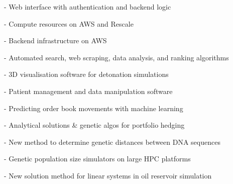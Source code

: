\documentclass[a4paper]{custom-resume}
\begin{document}
\begin{minipage}[t][0.8\textheight]{0.66\textwidth}
\vspace{2pt}
\sectionspace


\vspace{2pt}

- Web interface with authentication and backend logic

\vspace{2pt}

- Compute resources on AWS and Rescale

\vspace{2pt}

- Backend infrastructure on AWS

\vspace{2pt}

- Automated search, web scraping, data analysis, and ranking algorithms

\vspace{2pt}

- 3D visualisation software for detonation simulations

\vspace{2pt}

- Patient management and data manipulation software

\vspace{2pt}
\sectionspace


\vspace{2pt}

- Predicting order book movements with machine learning

\vspace{2pt}

- Analytical solutions \& genetic algos for portfolio hedging

\vspace{2pt}

- New method to determine genetic distances between DNA sequences

\vspace{2pt}

- Genetic population size simulators on large HPC platforms

\vspace{2pt}

- New solution method for linear systems in oil reservoir simulation

\vfill

\end{minipage}
\end{document}
